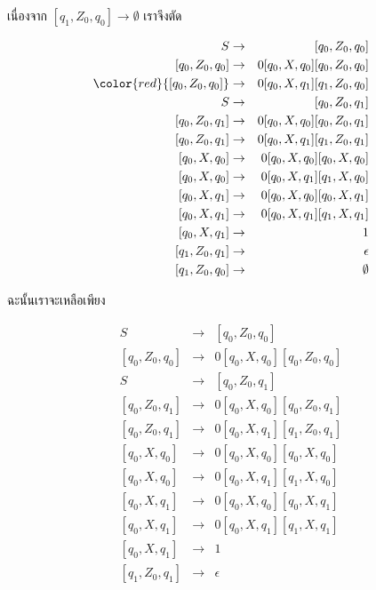 \par{
เนื่องจาก $[q_1, Z_0, q_0] \rightarrow \emptyset$ เราจึงตัด

\begin{eqnarray*}
S & \rightarrow & [q_0,Z_0, q_0] \\
\left[q_0, Z_0, q_0\right]& \rightarrow & 0 [ q_0, X, q_0][q_0, Z_0, q_0] \\
\color{red}{\left[q_0, Z_0, q_0\right]} & \rightarrow & 0 [ q_0, X, q_1][q_1, Z_0, q_0] \\
%
S & \rightarrow & [q_0,Z_0, q_1] \\
\left[q_0, Z_0, q_1\right] & \rightarrow & 0 [ q_0, X, q_0][q_0, Z_0, q_1] \\
\left[q_0, Z_0, q_1\right] & \rightarrow & 0 [ q_0, X, q_1][q_1, Z_0, q_1] \\
%
\left[q_0, X, q_0\right] & \rightarrow & 0[q_0, X, q_0][q_0, X, q_0] \\
\left[q_0, X, q_0\right] & \rightarrow & 0[q_0, X, q_1][q_1, X, q_0] \\
\left[q_0, X, q_1\right] & \rightarrow & 0[q_0, X, q_0][q_0, X, q_1] \\
\left[q_0, X, q_1\right] & \rightarrow & 0[q_0, X, q_1][q_1, X, q_1] \\
%
\left[q_0, X, q_1\right] & \rightarrow & 1 \\
\left[q_1, Z_0, q_1\right] & \rightarrow & \epsilon \\
\left[q_1, Z_0, q_0\right] & \rightarrow & \emptyset
\end{eqnarray*}

ฉะนั้นเราจะเหลือเพียง

\begin{eqnarray*}
S & \rightarrow & [q_0,Z_0, q_0] \\
\left[q_0, Z_0, q_0\right] & \rightarrow & 0 [ q_0, X, q_0][q_0, Z_0, q_0] \\
%
S & \rightarrow & [q_0,Z_0, q_1] \\
\left[q_0, Z_0, q_1\right] & \rightarrow & 0 [ q_0, X, q_0][q_0, Z_0, q_1] \\
\left[q_0, Z_0, q_1\right] & \rightarrow & 0 [ q_0, X, q_1][q_1, Z_0, q_1] \\
%
\left[q_0, X, q_0\right] & \rightarrow & 0[q_0, X, q_0][q_0, X, q_0] \\
\left[q_0, X, q_0\right] & \rightarrow & 0[q_0, X, q_1][q_1, X, q_0] \\
\left[q_0, X, q_1\right] & \rightarrow & 0[q_0, X, q_0][q_0, X, q_1] \\
\left[q_0, X, q_1\right] & \rightarrow & 0[q_0, X, q_1][q_1, X, q_1] \\
%
\left[q_0, X, q_1\right] & \rightarrow & 1 \\
\left[q_1, Z_0, q_1\right] & \rightarrow & \epsilon 
\end{eqnarray*}
}

